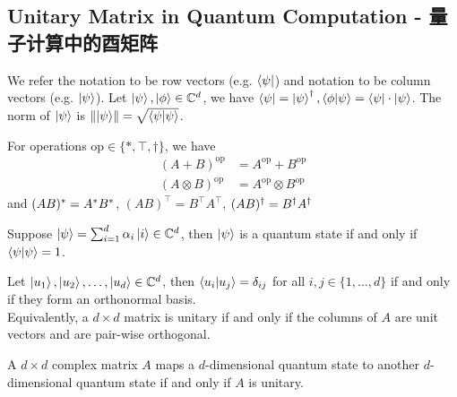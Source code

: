\subsection{Unitary Matrix in Quantum Computation - 量子计算中的酉矩阵}
We refer the  notation to be row vectors (e.g. $\bra{\psi}$) and  notation to be column vectors (e.g. $\ket{\psi}$). Let $\ket{\psi},\ket{\phi} \in \mathbb{C}^d$, we have $\bra{\psi} = \ket{\psi}^{\dagger}, \braket{\phi}{\psi} = \bra{\psi} \cdot \ket{\psi}$. The norm of $\ket{\psi}$ is $\norm{\ket{\psi}} = \sqrt{\braket{\psi}}$.
\begin{lemma}
    For operations $\text{op} \in \{*, \top, \dagger\}$, we have
    \begin{align*}
        (A + B)^{\text{op}} &= A^{\text{op}} + B^{\text{op}} \\
        (A \otimes B)^{\text{op}} &= A^{\text{op}} \otimes B^{\text{op}}
    \end{align*}
    and $(AB)^{*} = A^{*}B^{*}$, $(AB)^\top = B^\top A^\top$, $(AB)^{\dagger} = B^{\dagger}A^{\dagger}$
\end{lemma}
\begin{lemma}
    Suppose $\ket{\psi} = \sum_{i = 1}^{d} \alpha_i \ket{i} \in \mathbb{C}^d$, then $\ket{\psi}$ is a quantum state if and only if $\braket{\psi} = 1$.
\end{lemma}
\begin{theorem}
    Let $\ket{u_1}, \ket{u_2}, \dots, \ket{u_d} \in \mathbb{C}^d$, then $\braket{u_i}{u_j} = \delta_{ij}$ for all $i, j \in \{1, \dots, d\}$ if and only if they form an orthonormal basis. \\
    Equivalently, a $d \times d$ matrix is unitary if and only if the columns of $A$ are unit vectors and are pair-wise orthogonal.
\end{theorem}
\begin{theorem}
    A $d \times d$ complex matrix $A$ maps a $d$-dimensional quantum state to another $d$-dimensional quantum state if and only if $A$ is unitary.
\end{theorem}

\newpage